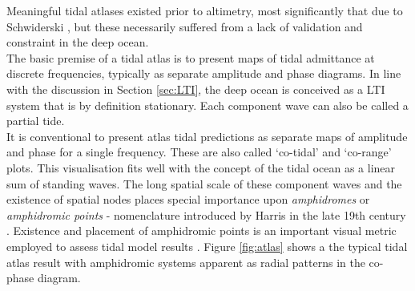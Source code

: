 Meaningful tidal atlases existed prior to altimetry, most significantly that due to Schwiderski \citep{Schwiderski:1983ke}, but these necessarily suffered from a lack of validation and constraint in the deep ocean.\\
The basic premise of a tidal atlas is to present maps of tidal admittance at discrete frequencies, typically as separate amplitude and phase diagrams.   In line with the discussion in Section \ref{sec:LTI}, the deep ocean is conceived as a LTI system that is by definition stationary.  Each component wave can also be called a partial tide.\\
It is conventional to present atlas tidal predictions as separate maps of amplitude and phase for a single frequency.  These are also called `co-tidal' and `co-range' plots.  This visualisation fits well with the concept of the tidal ocean as a linear sum of standing waves.   The long spatial scale of these component waves and the existence of spatial nodes places special importance upon \emph{amphidromes} or \emph{amphidromic points} - nomenclature introduced by Harris in the late 19th century \cite[pp 119]{Cartwright:2000tt}.  Existence and placement of amphidromic points is an important visual metric employed to assess tidal model results \citep{foreman:2012perscomm}.  Figure \ref{fig:atlas} shows a the typical tidal atlas result with amphidromic systems apparent as radial patterns in the co-phase diagram.


